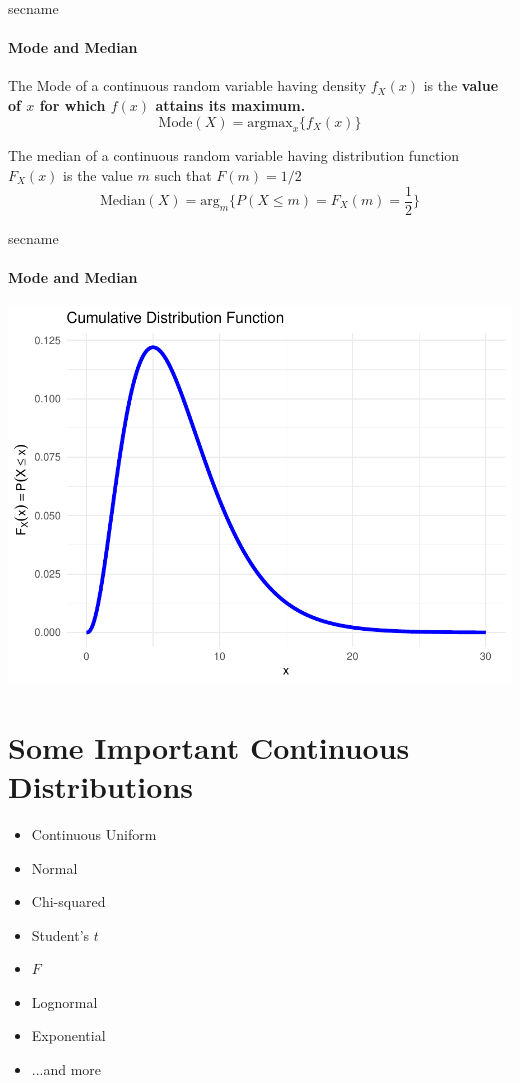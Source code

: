 \documentclass[notes=show,smaller,handout]{beamer}\usepackage[]{graphicx}\usepackage[]{color}
\newenvironment{knitrout}{}{} %
\begin{document}
\begin{frame}{secname}
\framesubtitle{Mode and Median}
  \begin{definition}[Mode]
    The Mode of a continuous random variable having
    density $f_{X}(x)$ is the \textbf{value of $x$ for which $f(x)$ attains its maximum.}
    $$\text{Mode}(X) = \text{argmax}_{x}\{f_X(x)\}$$
  \end{definition}

  \begin{definition}[Median]
  The median of a continuous random variable having
  distribution function $F_{X}(x)$ is the value $m$ such that $F(m) = 1/2$
  $$\text{Median}(X) = \text{arg}_{m}\{P(X\leq m) = F_X(m) = \frac{1}{2}\}$$
  \end{definition}
\end{frame}

\begin{frame}{secname}
\framesubtitle{Mode and Median}
\begin{knitrout}
\color{fgcolor}

{\centering \includegraphics[width=0.5\linewidth]{figure/unnamed-chunk-8-1} 

}



\end{knitrout}
\end{frame}

\section{Some Important Continuous Distributions}

\begin{frame}{\secname}

\begin{itemize}
  \item Continuous Uniform
  \item Normal
  \item Chi-squared
  \item Student's $t$
  \item $F$
  \item Lognormal
  \item Exponential
  \item ...and more
  \end{itemize}
\end{frame}%
\end{document}
